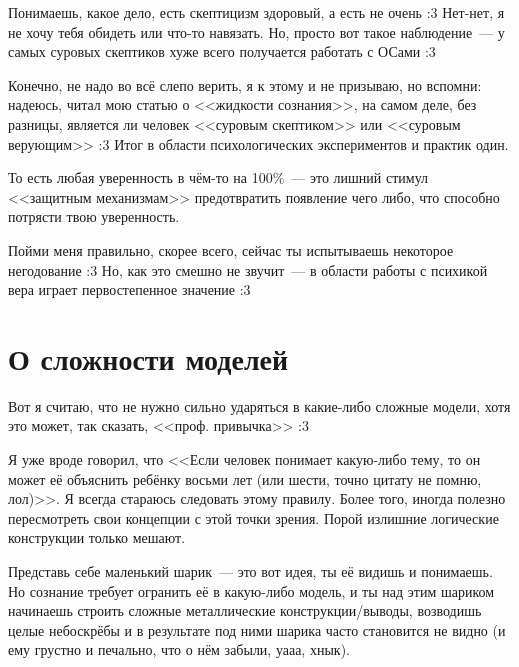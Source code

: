 \documentclass[a4paper,14pt,oneside]{memoir}
\begin{document}
\medskip

Понимаешь, какое дело, есть скептицизм здоровый, а есть не очень :3 Нет-нет, я не хочу тебя обидеть или что-то навязать. Но, просто вот такое наблюдение~--- у самых суровых скептиков хуже всего получается работать с ОСами :3 

Конечно, не надо во всё слепо верить, я к этому и не призываю, но вспомни: надеюсь, читал мою статью о <<жидкости сознания>>, на самом деле, без разницы, является ли человек <<суровым скептиком>> или <<суровым верующим>> :3 Итог в области психологических экспериментов и практик один. 

То есть любая уверенность в чём-то на 100\%~--- это лишний стимул <<защитным механизмам>> предотвратить появление чего либо, что способно потрясти твою уверенность. 

Пойми меня правильно, скорее всего, сейчас ты испытываешь некоторое негодование :3 Но, как это смешно не звучит~--- в области работы с психикой вера играет первостепенное значение :3 




\section{О сложности моделей}
Вот я считаю, что не нужно сильно ударяться в какие-либо сложные модели, хотя это может, так сказать, <<проф. привычка>> :3
 
Я уже вроде говорил, что <<Если человек понимает какую-либо тему, то он может её объяснить ребёнку восьми лет (или шести, точно цитату не помню,  лол)>>. Я всегда стараюсь следовать этому правилу. Более того, иногда полезно пересмотреть свои концепции с этой точки зрения. Порой излишние логические конструкции только мешают. 

Представь себе маленький шарик~--- это вот идея, ты её видишь и понимаешь. Но сознание требует огранить её в какую-либо модель, и ты над этим шариком начинаешь строить сложные металлические конструкции/выводы, возводишь целые небоскрёбы и в результате под ними шарика часто становится не видно (и ему грустно и печально, что о нём забыли, уааа, хнык). 
\end{document}
